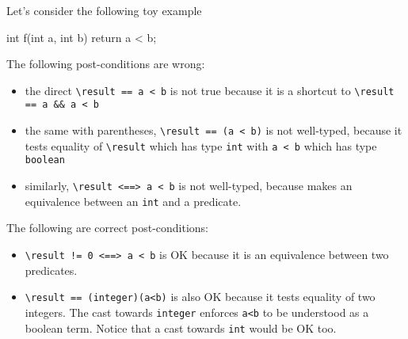 

Let's consider the following toy example
\begin{c}
  int f(int a, int b) { return a < b; }
\end{c}
The following post-conditions are wrong:
\begin{itemize}
\item the direct \verb|\result == a < b| is not true because it is a shortcut to \verb|\result == a && a < b|
\item the same with parentheses, \verb|\result == (a < b)| is not well-typed, because it tests equality of \verb|\result| which has type \verb|int| with \verb|a < b| which has type \verb|boolean|
\item similarly, \verb|\result <==> a < b| is not well-typed, because makes an equivalence between an \verb|int| and a predicate. 
\end{itemize}
The following are correct post-conditions:
\begin{itemize}
\item \verb|\result != 0 <==> a < b| is OK because it is an equivalence between two predicates.
\item \verb|\result == (integer)(a<b)| is also OK because it tests
  equality of two integers. The cast towards \verb|integer| enforces
  \verb|a<b| to be understood as a boolean term. Notice that a cast towards \verb|int| would be OK too.
\end{itemize}

